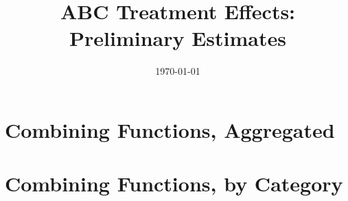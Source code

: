 
 

\title{ABC Treatment Effects: Preliminary Estimates} 

\date{\today} 

 

\maketitle 

\tableofcontents 

\clearpage 


\def\arraystretch{0.6}

\setlength\tabcolsep{0.3em}

\section{{Combining Functions, Aggregated}}


\begin{center}
	
\end{center}

\begin{center}
	
\end{center}

\begin{center}
	
\end{center}
\section{{Combining Functions, by Category}}


\begin{center}
	
\end{center}

\begin{center}
	
\end{center}

\begin{center}
	
\end{center}

\begin{center}
	
\end{center}

\begin{center}
	
\end{center}

